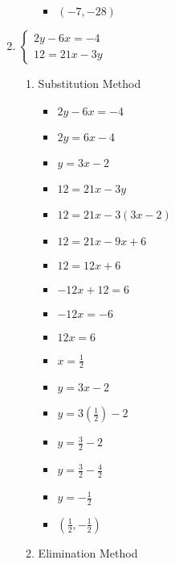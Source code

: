 \documentclass{article}
\begin{document}
\begin{enumerate}
\begin{enumerate}
\begin{itemize}
    \item $(-7,-28)$
    \end{itemize}
  \end{enumerate}
\item $\left\{ \begin{array}{l}
      2y-6x=-4 \\
      12=21x-3y \end{array} \right.$
  \begin{enumerate}
  \item Substitution Method
    \begin{itemize}
    \item $2y-6x=-4$
    \item $2y=6x-4$
    \item $y=3x-2$
    \item $12=21x-3y$
    \item $12=21x-3(3x-2)$
    \item $12=21x-9x+6$
    \item $12=12x+6$
    \item $-12x+12=6$
    \item $-12x=-6$
    \item $12x=6$
    \item {\Large $x=\frac{1}{2}$}
    \item $y=3x-2$
    \item {\Large $y=3\left(\frac{1}{2}\right)-2$}
    \item {\Large $y=\frac{3}{2}-2$}
    \item {\Large $y=\frac{3}{2}-\frac{4}{2}$}
    \item {\Large $y=-\frac{1}{2}$}
    \item {\Large $\left(\frac{1}{2},-\frac{1}{2}\right)$}
    \end{itemize}
  \item Elimination Method
\end{enumerate}
\end{enumerate}
\end{document}
